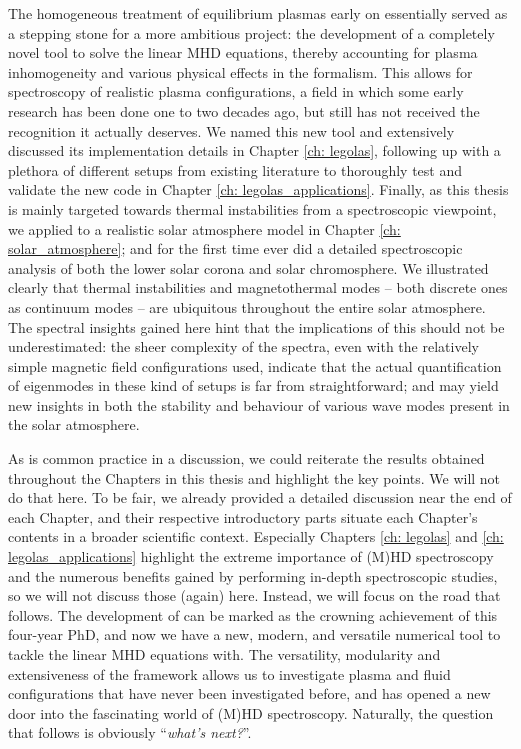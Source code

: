 The homogeneous treatment of equilibrium plasmas early on essentially served as a stepping stone for a more ambitious project: the development of a completely novel tool to solve the linear MHD equations, thereby accounting for plasma inhomogeneity and various physical effects in the formalism. This allows for spectroscopy of realistic plasma configurations, a field in which some early research has been done one to two decades ago, but still has not received the recognition it actually deserves. We named this new tool {\legolas} and extensively discussed its implementation details in Chapter \ref{ch: legolas}, following up with a plethora of different setups from existing literature to thoroughly test and validate the new code in Chapter \ref{ch: legolas_applications}. Finally, as this thesis is mainly targeted towards thermal instabilities from a spectroscopic viewpoint, we applied {\legolas} to a realistic solar atmosphere model in Chapter \ref{ch: solar_atmosphere}; and for the first time ever did a detailed spectroscopic analysis of both the lower solar corona and solar chromosphere. We illustrated clearly that thermal instabilities and magnetothermal modes -- both discrete ones as continuum modes -- are ubiquitous throughout the entire solar atmosphere. The spectral insights gained here hint that the implications of this should not be underestimated: the sheer complexity of the spectra, even with the relatively simple magnetic field configurations used, indicate that the actual quantification of eigenmodes in these kind of setups is far from straightforward; and may yield new insights in both the stability and behaviour of various wave modes present in the solar atmosphere.

As is common practice in a discussion, we could reiterate the results obtained throughout the Chapters in this thesis and highlight the key points. We will not do that here. To be fair, we already provided a detailed discussion near the end of each Chapter, and their respective introductory parts situate each Chapter's contents in a broader scientific context. Especially Chapters \ref{ch: legolas} and \ref{ch: legolas_applications} highlight the extreme importance of (M)HD spectroscopy and the numerous benefits gained by performing in-depth spectroscopic studies, so we will not discuss those (again) here. Instead, we will focus on the road that follows. The development of {\legolas} can be marked as the crowning achievement of this four-year PhD, and now we have a new, modern, and versatile numerical tool to tackle the linear MHD equations with. The versatility, modularity and extensiveness of the {\legolas} framework allows us to investigate plasma and fluid configurations that have never been investigated before, and has opened a new door into the fascinating world of (M)HD spectroscopy. Naturally, the question that follows is obviously ``\emph{what's next?}''.

